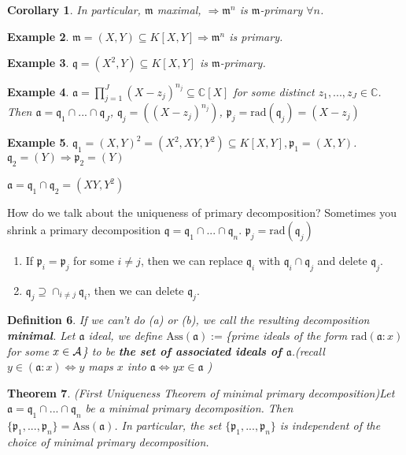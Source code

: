 \documentclass[11pt]{article}
\newtheorem{thm}{Theorem}[section]
\newtheorem{cor}[thm]{Corollary}
\newtheorem{dfn}[thm]{Definition}
\newtheorem{ex}[thm]{Example}
\newcommand{\cplx}{\mathbb C}
\newcommand{\sca}{{\mathfrak a}}
\newcommand{\scm}{{\mathfrak m}}
\newcommand{\scp}{{\mathfrak p}}
\newcommand{\scq}{\mathfrak q}
\newcommand{\cala}{{\cal A}}
\newcommand{\Lrta}{\Longrightarrow}
\newcommand{\Llrta}{\Longleftrightarrow}
\begin{document}
\begin{cor}In particular, 
$\scm$ maximal, $\Lrta\scm^n$ is $\scm$-primary $\forall n$.
\end{cor}
\begin{ex}
$\scm=(X,Y)\subseteq K[X,Y]\Lrta \scm^n$ is primary.
\end{ex}
\begin{ex}
$\scq=(X^2,Y)\subseteq K[X,Y]$ is $\scm$-primary.
\end{ex}
\begin{ex}
$\sca=\prod^J_{j=1}(X-z_j)^{n_j}\subseteq \cplx[X]$ for some distinct $z_1,...,z_J\in\cplx$. Then $\sca=\scq_1\cap...\cap\scq_J$, $\scq_j=((X-z_j)^{n_j})$, $\scp_j=\text{rad}(\scq_j)=(X-z_j)$ 
\end{ex}
\begin{ex}
$\scq_1=(X,Y)^2=(X^2,XY,Y^2)\subseteq K[X,Y],\scp_1=(X,Y)$. $\scq_2=(Y)\Lrta \scp_2=(Y)$

$\sca=\scq_1\cap\scq_2=(XY,Y^2)$
\end{ex}

How do we talk about the uniqueness of primary decomposition?
Sometimes you shrink a primary decomposition $\scq=\scq_1\cap...\cap\scq_n$. $\scp_j=\text{rad}(\scq_j)$ 
\begin{enumerate}[label=(\alph*)]
\item If $\scp_i=\scp_j$ for some $i\neq j$, then we can replace $\scq_i$ with $\scq_i\cap\scq_j$ and delete $\scq_j$.
\item $\scq_j\supseteq \cap_{i\neq j}\scq_i$, then we can delete $\scq_j$.
\end{enumerate}
\begin{dfn}
If we can't do (a) or (b), we call the resulting decomposition \textbf{minimal}. Let $\sca$ ideal, we define $\text{Ass}(  \sca):=$\{prime ideals of the form $\text{rad}(\sca:x)$ for some $x\in\cala$\} to be \textbf{the set of associated ideals of $\sca$}.(recall $y\in(\sca:x)\Llrta y$ maps $x$ into $\sca\Llrta yx\in\sca$ )
\end{dfn}

\begin{thm}(First Uniqueness Theorem of minimal primary decomposition)\label{thm:primary_decomposition_First_uniqueness}
Let $\sca=\scq_1\cap...\cap\scq_n$ be a minimal primary decomposition. Then $\{\scp_1,...,\scp_n\}=\text{Ass}(  \sca)$. In particular, the set $\{\scp_1,...,\scp_n\}$ is independent of the choice of minimal primary decomposition.
\end{thm}
\end{document}
